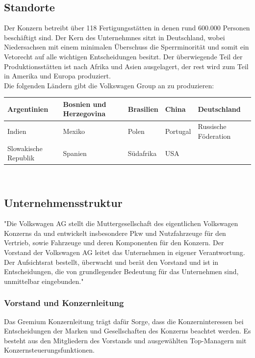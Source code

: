 \documentclass[12pt]{article}
\begin{document}
\newpage
\subsection{Standorte}
Der Konzern betreibt über 118 Fertigungsstätten in denen rund 600.000 Personen beschäftigt sind.
Der Kern des Unternehmnes sitzt in Deutschland, wobei Niedersachsen mit einem minimalen Überschuss die Sperrminorität und somit ein Vetorecht auf alle wichtigen Entscheidungen besitzt.
Der überwiegende Teil der Produktionsstätten ist nach Afrika und Asien ausgelagert, der rest wird zum Teil in Amerika und Europa produziert.\\
Die folgenden Ländern gibt die Volkswagen Group an zu produzieren: \cite{produktionsstandorte}
\begin{table}[h]
	\begin{tabular}{|l|l|l|l|l|}
		\hline
		Argentinien          & Bosnien und Herzegovina & Brasilien & China    & Deutschland          \\ \hline
		Indien               & Mexiko                  & Polen     & Portugal & Russische Föderation \\ \hline
		Slowakische Republik & Spanien                 & Südafrika & USA      &                      \\ \hline
	\end{tabular}
\end{table}
\\

\subsection{Unternehmensstruktur}
"Die Volkswagen AG stellt die Muttergesellschaft des eigentlichen Volkswagen Konzerns da und entwickelt insbesondere Pkw und Nutzfahrzeuge für den Vertrieb, sowie Fahrzeuge und deren Komponenten für den Konzern. Der Vorstand der Volkswagen AG leitet das Unternehmen in eigener Verantwortung. Der Aufsichtsrat bestellt, überwacht und berät den Vorstand und ist in Entscheidungen, die von grundlegender Bedeutung für das Unternehmen sind, unmittelbar eingebunden." \cite{struktur}

\subsubsection{Vorstand und Konzernleitung}
Das Gremium Konzernleitung trägt dafür Sorge, dass die Konzerninteressen bei Entscheidungen der Marken und Gesellschaften des Konzerns beachtet werden. Es besteht aus den Mitgliedern des Vorstands und ausgewählten Top-Managern mit Konzernsteuerungsfunktionen.\cite{struktur}
\newpage
\end{document}
